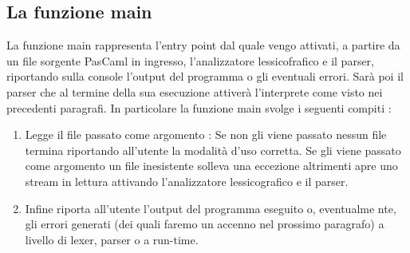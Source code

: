 \documentclass[a4paper,10pt]{article}
\begin{document}
\subsection{La funzione main}
La funzione main rappresenta l'entry point dal quale vengo attivati, a partire
da un file sorgente PasCaml in ingresso, l'analizzatore lessicofrafico e il
parser, riportando sulla console l'output del programma o gli eventuali errori.
Sar\`a poi il parser che al termine della sua esecuzione attiver\`a
l'interprete come visto nei precedenti paragrafi.
In particolare la funzione main svolge i seguenti compiti :
\begin{enumerate}
 \item Legge il file passato come argomento :
 \subitem Se non gli viene passato nessun file termina riportando all'utente la
modalit\`a d'uso corretta.
 \subitem Se gli viene passato come argomento un file inesistente solleva
una eccezione altrimenti apre uno stream in lettura attivando l'analizzatore
lessicografico e il parser. 

 \item Infine riporta all'utente l'output del programma eseguito o, eventualme
nte, gli errori generati (dei quali faremo un accenno nel prossimo paragrafo) a
livello di lexer, parser o a run-time.
\end{enumerate}
\end{document}
